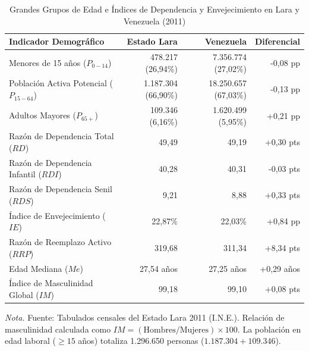 \documentclass[12pt,letterpaper]{article}
\begin{document}
\begin{table}[htbp]
    \centering
    \caption{Grandes Grupos de Edad e Índices de Dependencia y Envejecimiento en Lara y Venezuela (2011)}
    \label{tab:estructura}
    \small
    \begin{tabularx}{\textwidth}{>{\raggedright\arraybackslash}Xrrr}
        \toprule
        \textbf{Indicador Demográfico} & \textbf{Estado Lara} & \textbf{Venezuela} & \textbf{Diferencial} \\
        \midrule
        Menores de 15 años ($P_{0-14}$) & 478.217 (26,94\%) & 7.356.774 (27,02\%) & -0,08 pp \\
        Población Activa Potencial ($P_{15-64}$) & 1.187.304 (66,90\%) & 18.250.657 (67,03\%) & -0,13 pp \\
        Adultos Mayores ($P_{65+}$) & 109.346 (6,16\%) & 1.620.499 (5,95\%) & +0,21 pp \\
        \midrule
        Razón de Dependencia Total ($RD$) & 49,49 & 49,19 & +0,30 pts \\
        Razón de Dependencia Infantil ($RDI$) & 40,28 & 40,31 & -0,03 pts \\
        Razón de Dependencia Senil ($RDS$) & 9,21 & 8,88 & +0,33 pts \\
        Índice de Envejecimiento ($IE$) & 22,87\% & 22,03\% & +0,84 pp \\
        Razón de Reemplazo Activo ($RRP$) & 319,68 & 311,34 & +8,34 pts \\
        Edad Mediana ($Me$) & 27,54 años & 27,25 años & +0,29 años \\
        Índice de Masculinidad Global ($IM$) & 99,18 & 99,10 & +0,08 pts \\
        \bottomrule
    \end{tabularx}
    \par\vspace{2pt}\noindent\raggedright \small \textit{Nota.} Fuente: Tabulados censales del Estado Lara 2011 (I.N.E.). Relación de masculinidad calculada como $IM = (\text{Hombres} / \text{Mujeres}) \times 100$. La población en edad laboral ($\ge 15$ años) totaliza 1.296.650 personas ($1.187.304 + 109.346$).
\end{table}
\end{document}
